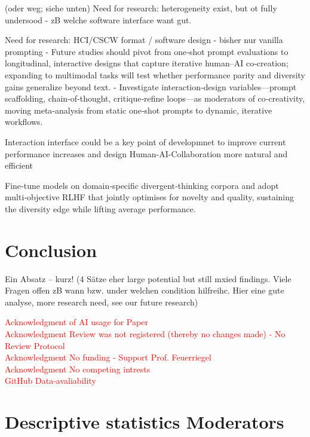 \documentclass[manuscript, screen, review, acmsmall, anonymous]{acmart}
\newcommand{\TODO}[1]{\textcolor{red}{#1}}
\begin{document}
(oder weg; siehe unten)
Need for research: heterogeneity exist, but ot fully undersood
- zB welche software interface want gut. 




Need for research: HCI/CSCW format / software design
- bisher nur vanilla prompting
- Future studies should pivot from one‑shot prompt evaluations to longitudinal, interactive designs that capture iterative human–AI co‑creation; expanding to multimodal tasks will test whether performance parity and diversity gains generalize beyond text.
- Investigate interaction‑design variables—prompt scaffolding, chain‑of‑thought, critique‑refine loops—as moderators of co‑creativity, moving meta‑analysis from static one‑shot prompts to dynamic, iterative workflows.
          \item Interaction interface could be a key point of developmnet to improve current performance increases and design Human-AI-Collaboration more natural and efficient 
          \item Fine‑tune models on domain‑specific divergent‑thinking corpora and adopt multi‑objective RLHF that jointly optimises for novelty and quality, sustaining the diversity edge while lifting average performance.



\section{Conclusion}
\label{sec:conclusion}

Ein Absatz -- kurz! (4 Sätze eher large potential but still mxied findings. Viele Fragen offen zB wann bzw. under welchen condition hilfreihc. Hier eine gute analyse, more research need, see our future research) 

 
\newpage



\newpage
\TODO{Acknowledgment of AI usage for Paper}\\
\TODO{Acknowledgment Review was not registered (thereby no changes made) - No Review Protocol}\\
\TODO{Acknowledgment No funding - Support Prof. Feuerriegel}\\
\TODO{Acknowledgment No competing intrests}\\
\TODO{GitHub Data-avaliability}
\appendix
\section{Descriptive statistics Moderators}
\end{document}
